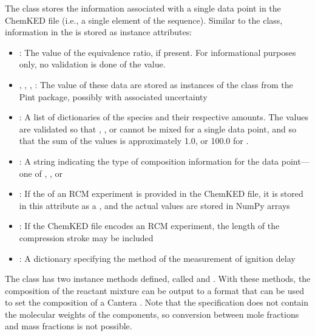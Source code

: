 \documentclass[12pt]{ussci}
\newcommand\ck{ChemKED}
\begin{document}
The  class stores the information associated with a single data
point in the \ck{} file (i.e., a single element of the 
sequence). Similar to the  class, information in the
 is stored as instance attributes:
%
\begin{itemize}
    \item {}: The value of the equivalence ratio, if
    present. For informational purposes only, no validation is done of the
    value.
    \item {}, , ,
    : The value of these data are stored as instances of
    the  class from the Pint \autocite{Grecco2016} package,
    possibly with associated uncertainty
    \item {}: A list of dictionaries of the species and their
    respective amounts. The values are validated so that ,
    , or  cannot be mixed for a single
    data point, and so that the sum of the values is approximately 1.0, or
    100.0 for .
    \item {}: A string indicating the type of composition
    information for the data point---one of ,
    , or 
    \item {}: If the  of an RCM
    experiment is provided in the \ck{} file, it is stored in this attribute as
    a , and the actual values are stored in NumPy arrays
    \autocite{vanderWalt:2011np}
    \item {}: If the \ck{} file encodes an RCM experiment,
    the length of the compression stroke may be included
    \item {}: A dictionary specifying the method of the
    measurement of ignition delay
\end{itemize}

The  class has two instance methods defined, called
 and .
With these methods, the composition of the reactant mixture can be output to a
format that can be used to set the composition of a Cantera .
Note that the  specification does not contain the molecular
weights of the components, so conversion between mole fractions and mass
fractions is not possible.
\end{document}
